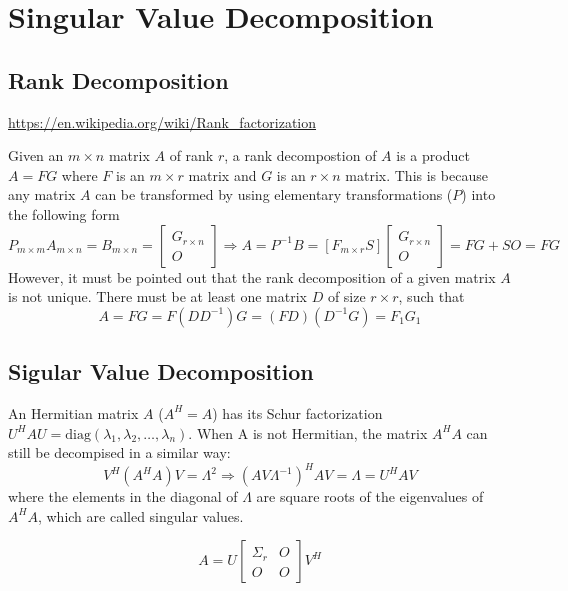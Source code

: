
\section{Singular Value Decomposition}

\subsection{Rank Decomposition}
\url{https://en.wikipedia.org/wiki/Rank_factorization}

Given an $m\times n$ matrix $A$ of rank $r$, a rank decompostion of $A$
is a product $A = FG$ where $F$ is an $m\times r$ matrix and $G$ is an $r\times n$ matrix. This is because any matrix $A$ can be transformed by using
elementary transformations ($P$) into the following form
$$ P_{m\times m}A_{m\times n} = B_{m\times n} = 
  \begin{bmatrix} G_{r\times n} \\ O \end{bmatrix} \Rightarrow
	  A = P^{-1}B = [F_{m\times r} S] 
          \begin{bmatrix} G_{r\times n} \\ O \end{bmatrix} = FG + SO = FG
	  $$
However, it must be pointed out that the rank decomposition of a given matrix
$A$ is not unique. There must be at least one matrix $D$ of size $r\times r$,
such that $$A = FG = F(DD^{-1})G = (FD)(D^{-1}G) = F_1G_1$$

\subsection{Sigular Value Decomposition}

An Hermitian matrix $A$ ($A^H=A$) has its Schur factorization
$U^HAU = \text{diag}(\lambda_1, \lambda_2, \ldots, \lambda_n)$.
When A is not Hermitian, the matrix $A^HA$ can still be decompised in a
similar way:
$$V^H(A^HA)V = \Lambda^2 \Rightarrow (AV\Lambda^{-1})^HAV = \Lambda = U^HAV$$
where the elements in the diagonal of $\Lambda$ are square roots of the
eigenvalues of $A^HA$, which are called singular values.

$$ A = U \begin{bmatrix} \Sigma_r & O \\ O & O\end{bmatrix} V^H$$
